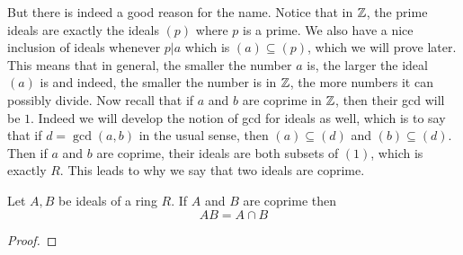\documentclass[a4paper]{article}
\begin{document}
But there is indeed a good reason for the name. Notice that in $\mathbb{Z}$, the prime ideals are exactly the ideals $(p)$ where $p$ is a prime. We also have a nice inclusion of ideals whenever $p|a$ which is $(a)\subseteq(p)$, which we will prove later. This means that in general, the smaller the number $a$ is, the larger the ideal $(a)$ is and indeed, the smaller the number is in $\mathbb{Z}$, the more numbers it can possibly divide. Now recall that if $a$ and $b$ are coprime in $\mathbb{Z}$, then their gcd will be $1$. Indeed we will develop the notion of gcd for ideals as well, which is to say that if $d=\gcd(a,b)$ in the usual sense, then $(a)\subseteq(d)$ and $(b)\subseteq(d)$. Then if $a$ and $b$ are coprime, their ideals are both subsets of $(1)$, which is exactly $R$. This leads to why we say that two ideals are coprime. 

\begin{prp}{}{} Let $A,B$ be ideals of a ring $R$. If $A$ and $B$ are coprime then $$AB=A\cap B$$ \tcbline
\begin{proof}

\end{proof}
\end{prp}
\end{document}
